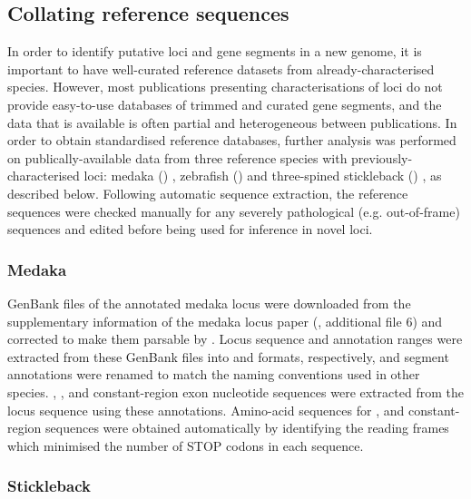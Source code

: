 \subsection{Collating reference sequences}

In order to identify putative \igh{} loci and gene segments in a new genome, it is important to have well-curated reference datasets from already-characterised species. However, most publications presenting characterisations of \igh{} loci do not provide easy-to-use databases of trimmed and curated gene segments, and the data that is available is often partial and heterogeneous between publications. In order to obtain standardised reference databases, further analysis was performed on publically-available data from three reference species with previously-characterised \igh{} loci: medaka () \parencite{magadan2011medaka}, zebrafish () \parencite{danilova2005zebrafish} and three-spined stickleback () \parencite{bao2010stickleback,gambondeza2011stickleback}, as described below. Following automatic sequence extraction, the reference sequences were checked manually for any severely pathological (e.g. out-of-frame) sequences and edited before being used for inference in novel loci.

\subsubsection{Medaka}
\label{sec:ref_locus_ola}

GenBank files of the annotated medaka \igh{} locus were downloaded from the supplementary information of the medaka locus paper (\parencite{magadan2011medaka}, additional file 6) and corrected to make them parsable by . Locus sequence and annotation ranges were extracted from these GenBank files into  and  formats, respectively, and segment annotations were renamed to match the naming conventions used in other species. \vh, \dh, \jh and constant-region exon nucleotide sequences were extracted from the locus sequence using these annotations. Amino-acid sequences for \vh, \jh and constant-region sequences were obtained automatically by identifying the reading frames which minimised the number of STOP codons in each sequence.

\subsubsection{Stickleback}
\label{sec:ref_locus_gac}

